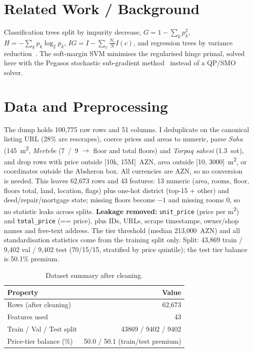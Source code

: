 \documentclass[10pt,twocolumn,a4paper]{article}
\begin{document}
\section{Related Work / Background}
Classification trees split by impurity decrease,
$G{=}1{-}\sum_k p_k^2$, $H{=}{-}\sum_k p_k\log_2 p_k$,
$IG{=}I{-}\sum_c \frac{N_c}{N}I(c)$, and regression trees by variance
reduction~\cite{pegasos}. The soft-margin SVM minimises the regularised
hinge primal, solved here with the Pegasos stochastic sub-gradient
method~\cite{pegasos} instead of a QP/SMO solver.

\section{Data and Preprocessing}
The dump holds 100{,}775 raw rows and 51 columns. I deduplicate on the
canonical listing URL (28\% are rescrapes), coerce prices and areas to
numeric, parse \textit{Saha} (145~m\textsuperscript{2},
\textit{Mertebe} (7~/~9 $\to$ floor and
total floors) and \textit{Torpaq sahesi} (1.3~sot), and drop
rows with price outside [10k, 15M]~AZN, area outside [10, 3000]~m\textsuperscript{2},
or coordinates outside the Absheron box. All currencies are AZN, so no
conversion is needed. This leaves 62{,}673 rows and 43 features:
13 numeric (area, rooms, floor, floors total, land, location, flags)
plus one-hot district (top-15 + other) and deed/repair/mortgage state;
missing floors become $-1$ and missing rooms $0$, so no statistic leaks
across splits. \textbf{Leakage removed:} \texttt{unit\_price} (price per
m\textsuperscript{2}) and \texttt{total\_price} (== price), plus IDs, URLs,
scrape timestamps, owner/shop names and free-text address. The tier
threshold (median 213{,}000~AZN) and all standardisation statistics come
from the training split only. Split: 43{,}869 train / 9{,}402 val /
9{,}402 test (70/15/15, stratified by price quintile); the test tier
balance is 50.1\% premium.

\begin{table}[t]
  \centering
  \caption{Dataset summary after cleaning.}
  \label{tab:data}
  \begin{tabular}{@{}lr@{}}
    \toprule
    Property & Value \\
    \midrule
    Rows (after cleaning)       & 62{,}673 \\
    Features used               & 43 \\
    Train / Val / Test split    & 43869 / 9402 / 9402 \\
    Price-tier balance (\%)     & 50.0 / 50.1 (train/test premium) \\
    \bottomrule
  \end{tabular}
\end{table}
\end{document}
